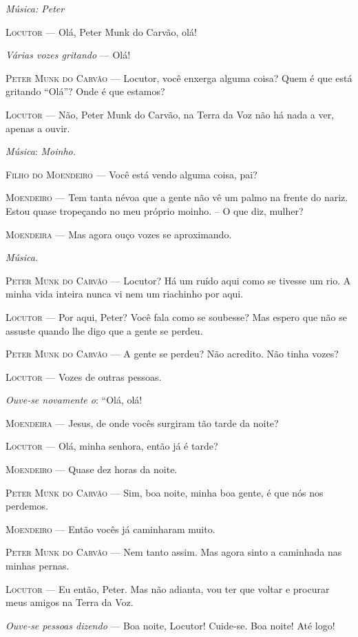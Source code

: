 \begin{myparindent}{0pt}
\begin{Parskip}
\emph{Música: Peter}

\textsc{Locutor} --- Olá, Peter Munk do Carvão, olá!

\emph{Várias vozes gritando} --- Olá!

\textsc{Peter Munk do Carvão} --- Locutor, você enxerga alguma coisa? Quem é que
está gritando ``Olá''? Onde é que estamos?

\textsc{Locutor} --- Não, Peter Munk do Carvão, na Terra da Voz não há nada a ver,
apenas a ouvir.

\emph{Música}: \emph{Moinho.}

\textsc{Filho do Moendeiro} --- Você está vendo alguma coisa, pai?

\textsc{Moendeiro} --- Tem tanta névoa que a gente não vê um palmo na frente do
nariz. Estou quase tropeçando no meu próprio moinho. -- O que diz,
mulher?

\textsc{Moendeira} --- Mas agora ouço vozes se aproximando.

\emph{Música.}

\textsc{Peter Munk do Carvão} --- Locutor? Há um ruído aqui como se tivesse um
rio. A minha vida inteira nunca vi nem um riachinho por aqui.

\textsc{Locutor} --- Por aqui, Peter? Você fala como se soubesse? Mas espero que
não se assuste quando lhe digo que a gente se perdeu.

\textsc{Peter Munk do Carvão} --- A gente se perdeu? Não acredito. Não tinha
vozes?

\textsc{Locutor} --- Vozes de outras pessoas.

\emph{Ouve-se novamente o}: ``Olá, olá!

\textsc{Moendeira} --- Jesus, de onde vocês surgiram tão tarde da noite?

\textsc{Locutor} --- Olá, minha senhora, então já é tarde?

\textsc{Moendeiro} --- Quase dez horas da noite.

\textsc{Peter Munk do Carvão} --- Sim, boa noite, minha boa gente, é que nós nos
perdemos.

\textsc{Moendeiro} --- Então vocês já caminharam muito.

\textsc{Peter Munk do Carvão} --- Nem tanto assim. Mas agora sinto a caminhada nas
minhas pernas.

\textsc{Locutor} --- Eu então, Peter. Mas não adianta, vou ter que voltar e
procurar meus amigos na Terra da Voz.

\emph{Ouve-se pessoas dizendo} --- Boa noite, Locutor! Cuide-se. Boa
noite! Até logo!


\end{Parskip}
\end{myparindent}
